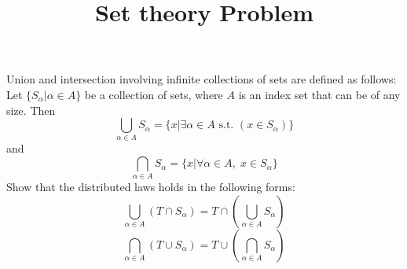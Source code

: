 \documentclass{exam}
\title{Set theory Problem}
\begin{document}
\maketitle

\begin{questions}

    \question Union and intersection involving infinite collections of sets are defined as follows:
    \\Let $\{S_\alpha|\alpha \in A\}$ be a collection of sets, where $A$ is an index set that can be of any size. Then 
    $$\bigcup_{\alpha \in A}S_\alpha = \{x| \exists \alpha \in A \text{ s.t. } (x \in S_\alpha)\}$$
    and
    $$\bigcap_{\alpha \in A}S_\alpha = \{x|\forall \alpha \in A,\; x \in S_\alpha\}$$
    Show that the distributed laws holds in the following forms:
    $$\bigcup_{\alpha \in A}(T \cap S_\alpha) = T \cap \left(\bigcup_{\alpha \in A}S_\alpha  \right)$$
    $$\bigcap_{\alpha \in A}(T \cup S_\alpha) = T \cup \left(\bigcap_{\alpha \in A}S_\alpha  \right)$$
    \begin{solution}
        
    \end{solution}

\end{questions}
\end{document}
